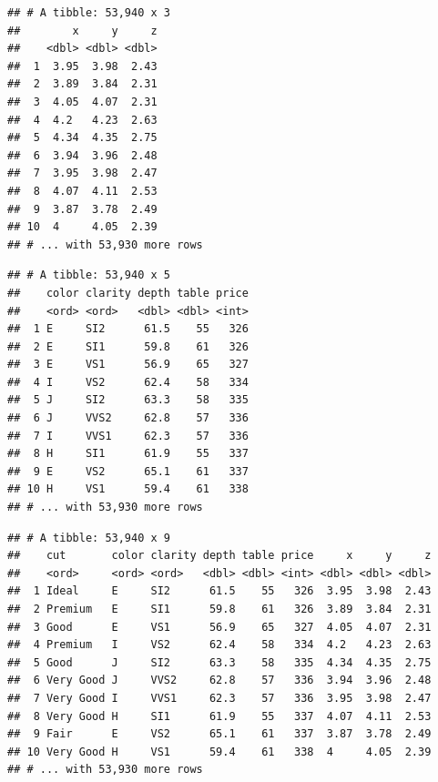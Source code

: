 \documentclass[]{book}
\newenvironment{Shaded}{\begin{snugshade}}{\end{snugshade}}
\newcommand{\DecValTok}[1]{\textcolor[rgb]{0.00,0.00,0.81}{#1}}
\newcommand{\KeywordTok}[1]{\textcolor[rgb]{0.13,0.29,0.53}{\textbf{#1}}}
\newcommand{\NormalTok}[1]{#1}
\newcommand{\OperatorTok}[1]{\textcolor[rgb]{0.81,0.36,0.00}{\textbf{#1}}}
\newcommand{\StringTok}[1]{\textcolor[rgb]{0.31,0.60,0.02}{#1}}
\begin{document}
\begin{Shaded}
\end{Shaded}

\begin{verbatim}
## # A tibble: 53,940 x 3
##        x     y     z
##    <dbl> <dbl> <dbl>
##  1  3.95  3.98  2.43
##  2  3.89  3.84  2.31
##  3  4.05  4.07  2.31
##  4  4.2   4.23  2.63
##  5  4.34  4.35  2.75
##  6  3.94  3.96  2.48
##  7  3.95  3.98  2.47
##  8  4.07  4.11  2.53
##  9  3.87  3.78  2.49
## 10  4     4.05  2.39
## # ... with 53,930 more rows
\end{verbatim}

\begin{Shaded}
\end{Shaded}

\begin{verbatim}
## # A tibble: 53,940 x 5
##    color clarity depth table price
##    <ord> <ord>   <dbl> <dbl> <int>
##  1 E     SI2      61.5    55   326
##  2 E     SI1      59.8    61   326
##  3 E     VS1      56.9    65   327
##  4 I     VS2      62.4    58   334
##  5 J     SI2      63.3    58   335
##  6 J     VVS2     62.8    57   336
##  7 I     VVS1     62.3    57   336
##  8 H     SI1      61.9    55   337
##  9 E     VS2      65.1    61   337
## 10 H     VS1      59.4    61   338
## # ... with 53,930 more rows
\end{verbatim}

\begin{Shaded}
\end{Shaded}

\begin{verbatim}
## # A tibble: 53,940 x 9
##    cut       color clarity depth table price     x     y     z
##    <ord>     <ord> <ord>   <dbl> <dbl> <int> <dbl> <dbl> <dbl>
##  1 Ideal     E     SI2      61.5    55   326  3.95  3.98  2.43
##  2 Premium   E     SI1      59.8    61   326  3.89  3.84  2.31
##  3 Good      E     VS1      56.9    65   327  4.05  4.07  2.31
##  4 Premium   I     VS2      62.4    58   334  4.2   4.23  2.63
##  5 Good      J     SI2      63.3    58   335  4.34  4.35  2.75
##  6 Very Good J     VVS2     62.8    57   336  3.94  3.96  2.48
##  7 Very Good I     VVS1     62.3    57   336  3.95  3.98  2.47
##  8 Very Good H     SI1      61.9    55   337  4.07  4.11  2.53
##  9 Fair      E     VS2      65.1    61   337  3.87  3.78  2.49
## 10 Very Good H     VS1      59.4    61   338  4     4.05  2.39
## # ... with 53,930 more rows
\end{verbatim}
\end{document}
